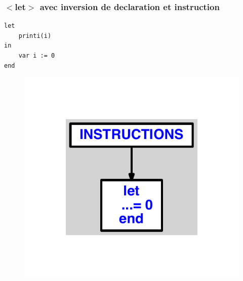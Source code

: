 \documentclass{article}
\begin{document}
\subsubsection{$ < $let$ > $ avec inversion de declaration et instruction}
\begin{lstlisting}
let
	printi(i)
in
	var i := 0
end
\end{lstlisting}
\newpage
\begin{figure}[H]
\centering
\includegraphics[max width=\textwidth]{ast/ast_269.pdf}
\end{figure}
\newpage
\end{document}
